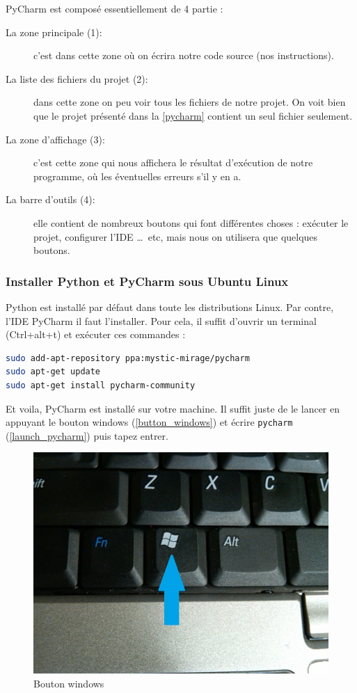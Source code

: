 \documentclass[12pt]{article}
\newcommand{\code}[1]{\colorbox{light-gray}{\texttt{#1}}}
\begin{document}
        PyCharm est composé essentiellement de 4 partie :
        \begin{description}
            \item[La zone principale (1):] c'est dans cette zone où on écrira notre code source (nos instructions).
            \item[La liste des fichiers du projet (2):] dans cette zone on peu voir tous les fichiers de notre projet. 
                On voit bien que le projet présenté dans la \autoref{pycharm} contient un seul fichier seulement.
            \item[La zone d'affichage (3):] c'est cette zone qui nous affichera le résultat d'exécution de notre 
                programme, où les éventuelles erreurs s'il y en a.
            \item[La barre d'outils (4):] elle contient de nombreux boutons qui font différentes choses : exécuter 
            le projet, configurer l'IDE \ldots\ etc, mais nous on utilisera que quelques boutons.
        \end{description}

        \subsubsection{Installer Python et PyCharm sous Ubuntu Linux}
            Python est installé par défaut dans toute les distributions Linux. Par contre, l'IDE PyCharm il 
            faut l'installer. Pour cela, il suffit d'ouvrir un terminal (Ctrl+alt+t) et exécuter ces commandes :
            \begin{lstlisting}[language=bash, style=code, numbers=none]
sudo add-apt-repository ppa:mystic-mirage/pycharm
sudo apt-get update
sudo apt-get install pycharm-community 
            \end{lstlisting} 

            Et voila, PyCharm est installé sur votre machine. Il suffit juste de le lancer en appuyant le bouton 
            windows (\autoref{button_windows}) et écrire \code{pycharm} (\autoref{launch_pycharm}) puis tapez entrer.

            \begin{figure}[H]
                \centering
                \includegraphics[width=0.5\linewidth]{img/8_windows_button.jpg}
                \caption{Bouton windows}
                \label{button_windows}
            \end{figure}
\end{document}

